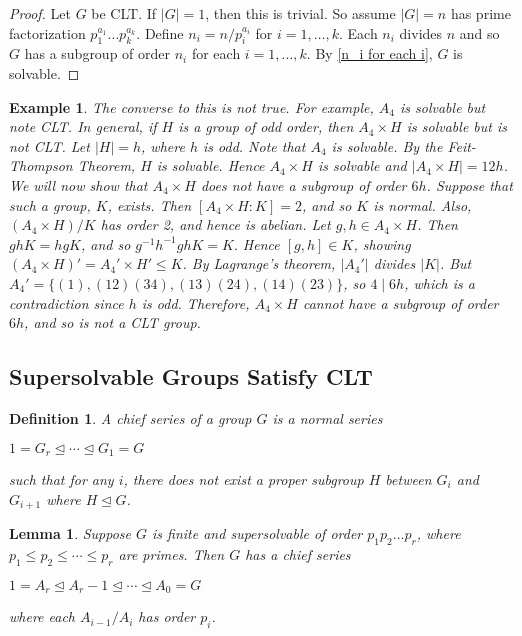 \documentclass[12pt]{report}
\theoremstyle{newthm}
\newtheorem{Definition}[lem]{Definition}
\newtheorem{Example}[lem]{Example}
\newtheorem{Lemma}[lem]{Lemma}
\begin{document}
\begin{proof}
Let $G$ be CLT. If $|G|=1$, then this is trivial. So assume $|G|=n$ has prime factorization $p_1^{a_1}\dotsc p_k^{a_k}$. Define $n_i = n/{p_i^{a_i}}$ for $i=1,\dotsc, k$. Each $n_i$ divides $n$ and so $G$ has a subgroup of order $n_i$ for each $i=1,\dotsc, k$. By \cref{n_i for each i}, $G$ is solvable. 
\end{proof}

\begin{Example}
The converse to this is not true. For example, $A_4$ is solvable but note CLT. In general, if $H$ is a group of odd order, then $A_4\times H$ is solvable but is not CLT. Let $|H|=h$, where $h$ is odd. Note that $A_4$ is solvable. By the Feit-Thompson Theorem, $H$ is solvable. Hence $A_4\times H$ is solvable and $|A_4\times H|=12h$. We will now show that $A_4\times H$ does not have a subgroup of order $6h$. Suppose that such a group, $K$, exists. Then $[A_4\times H : K]=2$, and so $K$ is normal. Also, ${(A_4\times H)}/K$ has order 2, and hence is abelian. Let $g,h \in A_4\times H$. Then $ghK =hgK$, and so $g^{-1}h^{-1}ghK=K. $ Hence $[g,h]\in K$, showing $(A_4\times H)'=A_4'\times H' \leq K$. By Lagrange's theorem, $|A_4'|$ divides $|K|$. But $A_4'=\{(1), (12)(34), (13)(24), (14)(23)\}$, so $4\mid 6h$, which is a contradiction since $h$ is odd. Therefore, $A_4\times H$ cannot have a subgroup of order $6h$, and so is not a CLT group.
\end{Example}

\subsection{Supersolvable Groups Satisfy CLT}

\begin{Definition}
A \textit{chief series} of a group $G$ is a normal series \begin{center}$1=G_r\trianglelefteq\dotsi\trianglelefteq G_1=G$\end{center} such that for any $i$, there does not exist a proper subgroup $H$ between $G_i$ and $G_{i+1}$ where $H\trianglelefteq G$.
\end{Definition}

\begin{Lemma}\label{chief series}\cite[Corollary 10.5.2]{Hall} Suppose $G$ is finite and supersolvable of order $p_1p_2\dots p_r$, where $p_1\leq p_2\leq\dotsi\leq p_r$ are primes. Then $G$ has a chief series \begin{center}$1 = A_r\trianglelefteq A_r-1\trianglelefteq\dotsi\trianglelefteq A_0 = G$ \end{center}
where each $A_{i-1}/A_i$ has order $p_i$.
\end{Lemma}
\end{document}

